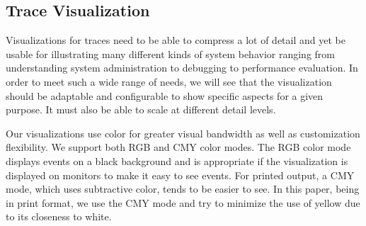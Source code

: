 
\subsection{Trace Visualization}
\label{sec:vis}

Visualizations for traces need to be able to compress a lot of detail
and yet be usable for illustrating many different
kinds of system behavior ranging from understanding
system administration to debugging to performance evaluation.
In order to meet such a wide range of needs, we will see that the visualization
should be adaptable and configurable to show specific aspects for a
given purpose.  It must also be able to scale at different detail levels.


Our visualizations use color for greater visual
bandwidth as well as customization flexibility. 
We support both RGB and CMY color modes.
The RGB color mode displays events on a black background
and is appropriate if the visualization is displayed on monitors to 
make it easy to see events.
For printed output, a CMY mode, which uses subtractive color,
tends to be easier to see.
In this paper, being in print format, we use the CMY mode
and try to minimize the use of yellow due to its closeness to white.


